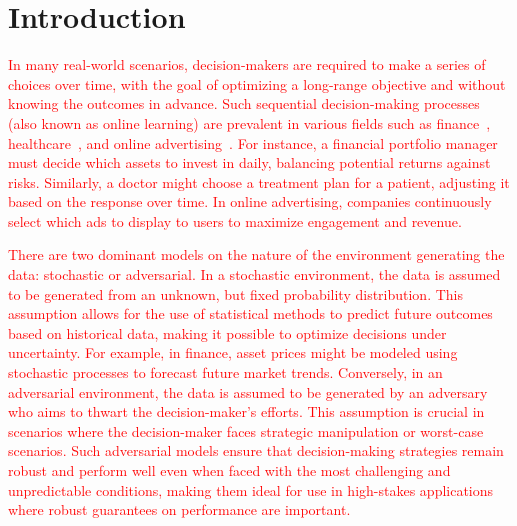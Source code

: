 \section{Introduction} 
\label{sec:intro}

\textcolor{red}{In many real-world scenarios, decision-makers are required to make a series of choices over time, with the goal of optimizing a long-range objective and without knowing the outcomes in advance. Such sequential decision-making processes (also known as online learning) are prevalent in various fields such as finance~\citep{bell1988game, ban2018machine}, healthcare~\citep{bastani2021efficient, killian2023robust}, and online advertising~\citep{wagner2019digital, choi2020online}. For instance, a financial portfolio manager must decide which assets to invest in daily, balancing potential returns against risks. Similarly, a doctor might choose a treatment plan for a patient, adjusting it based on the response over time. In online advertising, companies continuously select which ads to display to users to maximize engagement and revenue.}

\textcolor{red}{There are two dominant models on the nature of the environment generating the data: stochastic or adversarial. In a stochastic environment, the data is assumed to be generated from an unknown, but fixed probability distribution. This assumption allows for the use of statistical methods to predict future outcomes based on historical data, making it possible to optimize decisions under uncertainty. For example, in finance, asset prices might be modeled using stochastic processes to forecast future market trends. Conversely, in an adversarial environment, the data is assumed to be generated by an adversary who aims to thwart the decision-maker’s efforts. This assumption is crucial in scenarios where the decision-maker faces strategic manipulation or worst-case scenarios. Such adversarial models ensure that decision-making strategies remain robust and perform well even when faced with the most challenging and unpredictable conditions, making them ideal for use in high-stakes applications where robust guarantees on performance are important.}

